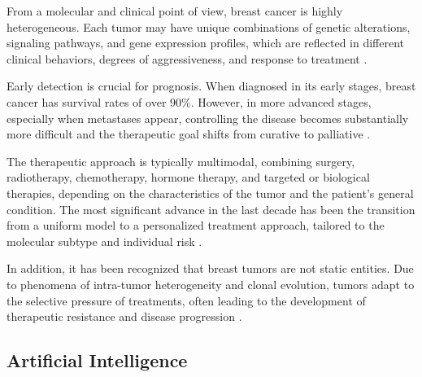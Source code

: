 From a molecular and clinical point of view, breast cancer is highly heterogeneous. Each tumor may have unique 
combinations of genetic alterations, signaling pathways, and gene expression profiles, which are reflected in different 
clinical behaviors, degrees of aggressiveness, and response to treatment \cite{origins_and_evolution_bca_Polyak2007,diff_bca_usa_Howlader2018}.

Early detection is crucial for prognosis. When diagnosed in its early stages, breast cancer has survival rates of over 
$90\%$. However, in more advanced stages, especially when metastases appear, controlling the disease becomes substantially 
more difficult and the therapeutic goal shifts from curative to palliative \cite{updatedbca_Hong2022Breast,clinical_implication_bca_Adamo2015}.

The therapeutic approach is typically multimodal, combining surgery, radiotherapy, chemotherapy, hormone therapy, and 
targeted or biological therapies, depending on the characteristics of the tumor and the patient's general condition. 
The most significant advance in the last decade has been the transition from a uniform model to a personalized treatment 
approach, tailored to the molecular subtype and individual risk \cite{BreastEpidemiology_Romanowicz2022}.

In addition, it has been recognized that breast tumors are not static entities. Due to phenomena of intra-tumor heterogeneity 
and clonal evolution, tumors adapt to the selective pressure of treatments, often leading to the development of therapeutic 
resistance and disease progression \cite{origins_and_evolution_bca_Polyak2007}.



\subsection{Artificial Intelligence}
